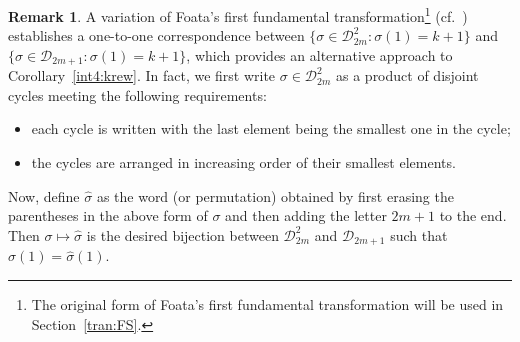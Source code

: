 \documentclass[11pt,reqno]{amsart}
\numberwithin{equation}{section}
\theoremstyle{plain}
\theoremstyle{definition}
\newtheorem{remark}[theorem]{Remark}
\begin{document}
\begin{remark}
A variation of Foata's first fundamental transformation\footnote{The original form of Foata's first fundamental transformation will be used in Section~\ref{tran:FS}.} (cf.~\cite[Prop. 1.3.1]{St}) establishes a one-to-one correspondence between $\{\sigma\in\mathcal{D}^2_{2m}: \sigma(1)=k+1\}$ and $\{\sigma\in\mathcal{D}_{2m+1}: \sigma(1)=k+1\}$, which provides an alternative approach to Corollary~\ref{int4:krew}. In fact, we first write $\sigma\in\mathcal{D}^2_{2m}$ as a product of disjoint cycles meeting the following requirements:
 \begin{itemize}
 \item[(a)] each cycle is written with the last element being the smallest one in the cycle;
 \item[(b)] the cycles are arranged in increasing order of their smallest elements.
 \end{itemize}
 Now, define $\hat\sigma$ as the word (or permutation) obtained  by first erasing the parentheses in the above form of $\sigma$ and then adding the letter $2m+1$ to the end. Then $\sigma\mapsto\hat\sigma$ is the desired bijection between $\mathcal{D}^2_{2m}$ and $\mathcal{D}_{2m+1}$ such that $\sigma(1)=\hat\sigma(1)$.
\end{remark}
\end{document}
